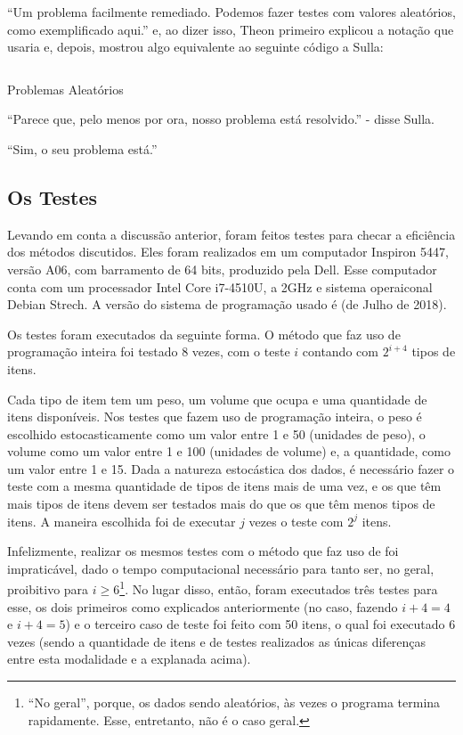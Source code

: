 \documentclass{article}
\begin{document}
``Um problema facilmente remediado. Podemos fazer testes com valores
aleatórios, como exemplificado aqui.'' e, ao dizer isso, Theon
primeiro explicou a notação que usaria e, depois, mostrou algo
equivalente ao seguinte código a Sulla:

\begin{listing}[H]
  \inputminted{prolog}{../Exemplos/Cap12/test/random.ecl}
  \caption{Problemas Aleatórios}\label{lst:random}
\end{listing}

``Parece que, pelo menos por ora, nosso problema está resolvido.'' -
disse Sulla.

``Sim, o seu problema está.''

\subsection{Os Testes}

Levando em conta a discussão anterior, foram feitos testes para
checar a eficiência dos métodos discutidos. Eles foram realizados em
um computador Inspiron 5447, versão A06, com barramento de 64 bits,
produzido pela Dell. Esse computador conta com um processador Intel
Core i7-4510U, a 2GHz e sistema operaiconal Debian Strech. A versão do
sistema de programação usado é  (de Julho de 2018). 

Os testes foram executados da seguinte forma. O método que faz uso de
programação inteira foi testado 8 vezes, com o teste $i$ contando
com $2^{i+4}$ tipos de itens.

Cada tipo de item tem um peso, um volume que ocupa e uma quantidade
de itens disponíveis. Nos testes que fazem uso de programação
inteira, o peso é escolhido estocasticamente como um valor entre 1 e
50 (unidades de peso), o volume como um valor entre 1 e 100
(unidades de volume) e, a quantidade, como um valor entre 1 e
15. Dada a natureza estocástica dos dados, é necessário fazer o
teste com a mesma quantidade de tipos de itens mais de uma vez, e os
que têm mais tipos de itens devem ser testados mais do que os que
têm menos tipos de itens. A maneira escolhida foi de executar $j$ vezes
o teste com $2^j$ itens.

Infelizmente, realizar os mesmos testes com o método que faz uso de
 foi impraticável, dado o tempo
computacional necessário para tanto ser, no geral, proibitivo para
$i \geq 6$\footnote{``No geral'', porque, os dados sendo aleatórios,
  às vezes o programa termina rapidamente. Esse, entretanto, não é o
  caso geral.}. No lugar disso, então, foram executados três testes
para esse, os dois primeiros como explicados anteriormente (no caso,
fazendo $i + 4 = 4$ e $i + 4 = 5$) e o terceiro caso de teste foi
feito com 50 itens, o qual foi executado 6 vezes (sendo a quantidade de
itens e de testes realizados as únicas diferenças entre esta
modalidade e a explanada acima).
\end{document}
